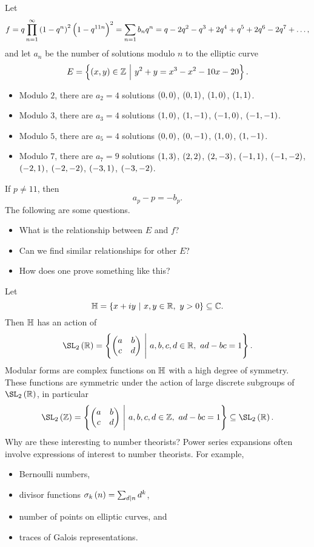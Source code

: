 Let
$$ f = q\prod_{n = 1}^\infty \br{1 - q^n}^2\br{1 - q^{11n}}^2 = \sum_{n = 1} b_nq^n = q - 2q^2 - q^3 + 2q^4 + q^5 + 2q^6 - 2q^7 + \dots, $$
and let $ a_n $ be the number of solutions modulo $ n $ to the elliptic curve
$$ E = \cbr{\br{x, y} \in \ZZ \st y^2 + y = x^3 - x^2 - 10x - 20}. $$
\begin{itemize}
\item Modulo $ 2 $, there are $ a_2 = 4 $ solutions $ \br{0, 0} $, $ \br{0, 1} $, $ \br{1, 0} $, $ \br{1, 1} $.
\item Modulo $ 3 $, there are $ a_3 = 4 $ solutions $ \br{1, 0} $, $ \br{1, -1} $, $ \br{-1, 0} $, $ \br{-1, -1} $.
\item Modulo $ 5 $, there are $ a_5 = 4 $ solutions $ \br{0, 0} $, $ \br{0, -1} $, $ \br{1, 0} $, $ \br{1, -1} $.
\item Modulo $ 7 $, there are $ a_7 = 9 $ solutions $ \br{1, 3} $, $ \br{2, 2} $, $ \br{2, -3} $, $ \br{-1, 1} $, $ \br{-1, -2} $, $ \br{-2, 1} $, $ \br{-2, -2} $, $ \br{-3, 1} $, $ \br{-3, -2} $.
\end{itemize}
If $ p \ne 11 $, then
$$ a_p - p = -b_p. $$
The following are some questions.
\begin{itemize}
\item What is the relationship between $ E $ and $ f $?
\item Can we find similar relationships for other $ E $?
\item How does one prove something like this?
\end{itemize}
Let
$$ \HH = \cbr{x + iy \st x, y \in \RR, \ y > 0} \subseteq \CC. $$
Then $ \mathbb{H} $ has an action of
$$ \SL_2\br{\RR} = \cbr{\twobytwo{a}{b}{c}{d} \st a, b, c, d \in \RR, \ ad - bc = 1}. $$
Modular forms are complex functions on $ \mathbb{H} $ with a high degree of symmetry. These functions are symmetric under the action of large discrete subgroups of $ \SL_2\br{\RR} $, in particular
$$ \SL_2\br{\ZZ} = \cbr{\twobytwo{a}{b}{c}{d} \st a, b, c, d \in \ZZ, \ ad - bc = 1} \subseteq \SL_2\br{\RR}. $$
Why are these interesting to number theorists? Power series expansions often involve expressions of interest to number theorists. For example,
\begin{itemize}
\item Bernoulli numbers,
\item divisor functions $ \sigma_k\br{n} = \sum_{d \mid n} d^k $,
\item number of points on elliptic curves, and
\item traces of Galois representations.
\end{itemize}

